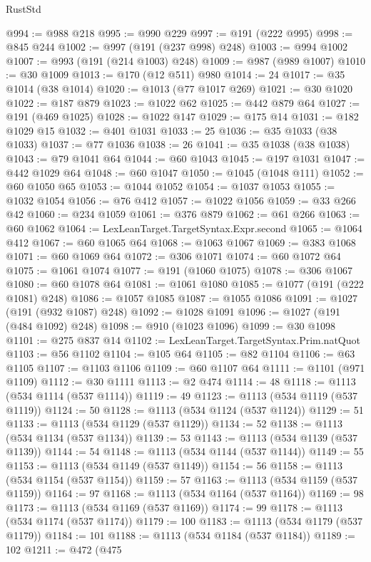 \begin{lexlean}{RustStd}
\begin{coremodule}
@994 := @988 @218
@995 := @990 @229
@997 := @191 (@222 @995)
@998 := @845 @244
@1002 := @997 (@191 (@237 @998) @248)
@1003 := @994 @1002
@1007 := @993 (@191 (@214 @1003) @248)
@1009 := @987 (@989 @1007)
@1010 := @30 @1009
@1013 := @170 (@12 @511) @980
@1014 := 24
@1017 := @35 @1014 (@38 @1014)
@1020 := @1013 (@77 @1017 @269)
@1021 := @30 @1020
@1022 := @187 @879
@1023 := @1022 @62
@1025 := @442 @879 @64
@1027 := @191 (@469 @1025)
@1028 := @1022 @147
@1029 := @175 @14
@1031 := @182 @1029 @15
@1032 := @401 @1031
@1033 := 25
@1036 := @35 @1033 (@38 @1033)
@1037 := @77 @1036
@1038 := 26
@1041 := @35 @1038 (@38 @1038)
@1043 := @79 @1041 @64
@1044 := @60 @1043
@1045 := @197 @1031
@1047 := @442 @1029 @64
@1048 := @60 @1047
@1050 := @1045 (@1048 @111)
@1052 := @60 @1050 @65
@1053 := @1044 @1052
@1054 := @1037 @1053
@1055 := @1032 @1054
@1056 := @76 @412
@1057 := @1022 @1056
@1059 := @33 @266 @42
@1060 := @234 @1059
@1061 := @376 @879
@1062 := @61 @266
@1063 := @60 @1062
@1064 := LexLeanTarget.TargetSyntax.Expr.second
@1065 := @1064 @412
@1067 := @60 @1065 @64
@1068 := @1063 @1067
@1069 := @383 @1068
@1071 := @60 @1069 @64
@1072 := @306 @1071
@1074 := @60 @1072 @64
@1075 := @1061 @1074
@1077 := @191 (@1060 @1075)
@1078 := @306 @1067
@1080 := @60 @1078 @64
@1081 := @1061 @1080
@1085 := @1077 (@191 (@222 @1081) @248)
@1086 := @1057 @1085
@1087 := @1055 @1086
@1091 := @1027 (@191 (@932 @1087) @248)
@1092 := @1028 @1091
@1096 := @1027 (@191 (@484 @1092) @248)
@1098 := @910 (@1023 @1096)
@1099 := @30 @1098
@1101 := @275 @837 @14
@1102 := LexLeanTarget.TargetSyntax.Prim.natQuot
@1103 := @56 @1102
@1104 := @105 @64
@1105 := @82 @1104
@1106 := @63 @1105
@1107 := @1103 @1106
@1109 := @60 @1107 @64
@1111 := @1101 (@971 @1109)
@1112 := @30 @1111
@1113 := @2 @474
@1114 := 48
@1118 := @1113 (@534 @1114 (@537 @1114))
@1119 := 49
@1123 := @1113 (@534 @1119 (@537 @1119))
@1124 := 50
@1128 := @1113 (@534 @1124 (@537 @1124))
@1129 := 51
@1133 := @1113 (@534 @1129 (@537 @1129))
@1134 := 52
@1138 := @1113 (@534 @1134 (@537 @1134))
@1139 := 53
@1143 := @1113 (@534 @1139 (@537 @1139))
@1144 := 54
@1148 := @1113 (@534 @1144 (@537 @1144))
@1149 := 55
@1153 := @1113 (@534 @1149 (@537 @1149))
@1154 := 56
@1158 := @1113 (@534 @1154 (@537 @1154))
@1159 := 57
@1163 := @1113 (@534 @1159 (@537 @1159))
@1164 := 97
@1168 := @1113 (@534 @1164 (@537 @1164))
@1169 := 98
@1173 := @1113 (@534 @1169 (@537 @1169))
@1174 := 99
@1178 := @1113 (@534 @1174 (@537 @1174))
@1179 := 100
@1183 := @1113 (@534 @1179 (@537 @1179))
@1184 := 101
@1188 := @1113 (@534 @1184 (@537 @1184))
@1189 := 102
@1211 := @472
    (@475

\end{coremodule}
\end{lexlean}
